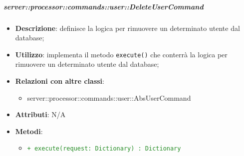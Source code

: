         \subparagraph{server::processor::commands::user::DeleteUserCommand} %
        \label{subp:bdsm_app_server_processor_commands_user_deleteusercommand}
        \begin{itemize}
          \item \textbf{Descrizione}: definisce la logica per rimuovere un determinato utente dal database;
          \item \textbf{Utilizzo}: implementa il metodo \texttt{execute()} che conterrà la logica per rimuovere un determinato utente dal database;
          \item \textbf{Relazioni con altre classi}:
            \begin{itemize}
              \item server::processor::commands::user::AbsUserCommand
            \end{itemize}
          \item \textbf{Attributi}: N/A
          \item \textbf{Metodi}:
          \begin{itemize}
              \item \textcolor{forestgreen}{\texttt{+ execute(request: Dictionary) : Dictionary}}
          \end{itemize}
        \end{itemize}

